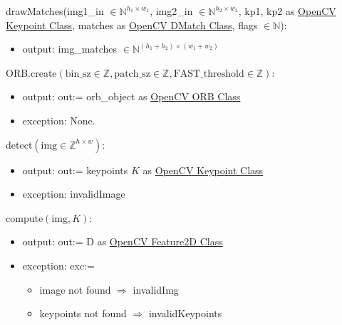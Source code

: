 \documentclass[12pt, titlepage]{article}
\begin{document}
\noindent drawMatches(img1\_in $\in \mathbb{N}^{h_{1} \times w_{1}}$, img2\_in $\in \mathbb{N}^{h_{2} \times w_{2}}$,
kp1, kp2 as \href{https://docs.opencv.org/3.4/d2/d29/classcv_1_1KeyPoint.html}{OpenCV Keypoint Class}, 
matches as \href{https://docs.opencv.org/3.4/d4/de0/classcv_1_1DMatch.html}{OpenCV DMatch Class},
flags $\in \mathbb{N}$):
\begin{itemize}
\item output: img\_matches $\in \mathbb{N}^{(h_{1}+h_{2}) \times (w_{1}+w_{2})}$
\end{itemize}

\noindent ORB.create$(\text{bin\_sz} \in \mathbb{Z}, \text{patch\_sz} \in \mathbb{Z}, \text{FAST\_threshold} \in \mathbb{Z})$:
\begin{itemize}
    \item output: out:= orb\_object as \href{https://docs.opencv.org/3.4/db/d95/classcv_1_1ORB.html}{OpenCV ORB Class}
    \item exception: None. 
\end{itemize}

\noindent detect$(\text{img} \in \mathbb{Z}^{h \times w})$:
\begin{itemize}
    \item output: out:= keypoints $K$ as  \href{https://docs.opencv.org/3.4/d2/d29/classcv_1_1KeyPoint.html}{OpenCV Keypoint Class}
    \item exception: invalidImage
\end{itemize}

\noindent compute$(\text{img}, K)$:
\begin{itemize}
    \item output: out:= D as \href{https://docs.opencv.org/4.x/d0/d13/classcv_1_1Feature2D.html}{OpenCV Feature2D Class}
    \item exception: exc:=
    \begin{itemize}
      \item image not found $\Rightarrow$ invalidImg
      \item keypoints not found $\Rightarrow$ invalidKeypoints
    \end{itemize}
\end{itemize}
\end{document}
